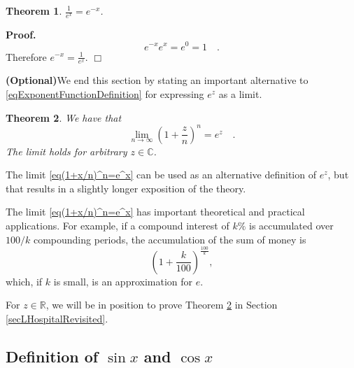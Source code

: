 \documentclass[12pt]{book}
\newenvironment{proof}[1][]{ \textbf{Proof#1.} }{$\Box$\medskip}
\newtheorem{theorem}{Theorem}[section]
\newcommand{\optionalMaterial}{\textbf{(Optional)}}
\begin{document}
\begin{theorem}
$\frac{1}{e^{x}}= e^{-x}$\quad .
\end{theorem}
\begin{proof}
\[e^{-x}e^x=e^0 = 1\quad .
\]
Therefore $e^{-x}=\frac{1}{e^x}.$
\end{proof}

\optionalMaterial We end this section by stating an important alternative to \ref{eqExponentFunctionDefinition} for expressing $e^z$ as a limit.   
\begin{theorem}\label{th(1+x/n)^n=e^x}
We have that
\begin{equation}\label{eq(1+x/n)^n=e^x}
\lim_{n\to \infty} \left(1+\frac{z}n\right)^n= e^z\quad .
\end{equation}
The limit holds for arbitrary $z\in \mathbb C$.
\end{theorem}
The limit \eqref{eq(1+x/n)^n=e^x} can be used as an alternative definition of $e^{z}$, but that results in a slightly longer exposition of the theory.  

The limit \eqref{eq(1+x/n)^n=e^x} has important theoretical and practical applications. For example, if a compound interest of $ k\%$ is accumulated over $100/k $ compounding periods, the accumulation of the sum of money is 
\[
(1+\frac{k}{100})^{\frac{100}{k}}, 
\]
which, if $k$ is small, is an approximation for $e$.

For $z\in \mathbb R$, we will be in position to prove Theorem \ref{th(1+x/n)^n=e^x} in Section \ref{secLHospitalRevisited}.
\subsection{Definition of $\sin x$ and $\cos x$}
  
\end{document}
